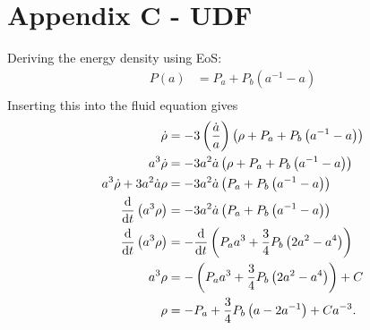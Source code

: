 \documentclass[a4paper, 11pt]{FSKH_623_Report}
\numberwithin{equation}{section}
\newcommand{\brac}[1]{\left(#1\right)}
\begin{document}
\section*{Appendix C - UDF}
Deriving the energy density using EoS:
\begin{equation}\label{eq:UDFEoS}
\begin{split}
P(a) &= P_{a}+P_{b}\brac{a^{-1}-a}        \\
\end{split}
\end{equation}
Inserting this into the fluid equation gives
\begin{equation}\label{eq:UDFED}
\begin{split}
\dot{\rho} &= -3\brac{\frac{\dot{a}}{a}}\brac{\rho+P_{a}+P_{b}\brac{a^{-1}-a}} \\
a^{3}\dot{\rho} &= -3a^{2}\dot{a}\brac{\rho+P_{a}+P_{b}\brac{a^{-1}-a}} \\
a^{3}\dot{\rho}+3a^{2}\dot{a}\rho &= -3a^{2}\dot{a}\brac{P_{a}+P_{b}\brac{a^{-1}-a}} \\
\dv{t}\brac{a^{3}\rho}&= -3a^{2}\dot{a}\brac{P_{a}+P_{b}\brac{a^{-1}-a}} \\
\dv{t}\brac{a^{3}\rho}&= -\dv{t}\brac{P_{a}a^{3}+\frac{3}{4}P_{b}\brac{2a^{2}-a^{4}}} \\
a^{3}\rho&= -\brac{P_{a}a^{3}+\frac{3}{4}P_{b}\brac{2a^{2}-a^{4}}}+C \\
\rho&= -P_{a}+\frac{3}{4}P_{b}\brac{a-2a^{-1}}+Ca^{-3}. \\
\end{split}
\end{equation}




%                               
                               
 
\pagebreak

%
\end{document}
